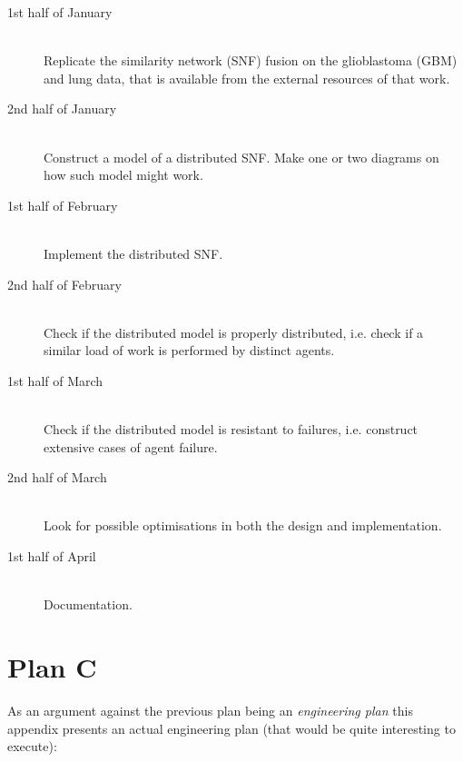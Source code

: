 \documentclass[11pt,a4paper,twoside,openright]{report}
\begin{document}
\begin{description}
\item[1st half of January] \hfill \\
Replicate the similarity network (SNF) fusion on the glioblastoma (GBM) and
lung data, that is available from the external resources of that work.

\item[2nd half of January] \hfill \\
Construct a model of a distributed SNF.  Make one or two diagrams on how such
model might work.

\item[1st half of February] \hfill \\
Implement the distributed SNF.

\item[2nd half of February] \hfill \\
Check if the distributed model is properly distributed, i.e. check if a similar
load of work is performed by distinct agents.

\item[1st half of March] \hfill \\
Check if the distributed model is resistant to failures, i.e. construct
extensive cases of agent failure.

\item[2nd half of March] \hfill \\
Look for possible optimisations in both the design and implementation.

\item[1st half of April] \hfill \\
Documentation.

\end{description}

\clearpage{\pagestyle{empty}\cleardoublepage}
\chapter{Plan C}

As an argument against the previous plan being an \emph{engineering plan} this
appendix presents an actual engineering plan (that would be quite interesting
to execute):
\end{document}
